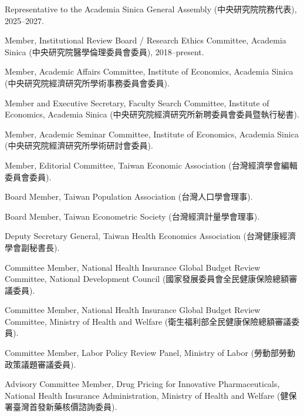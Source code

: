 \documentclass[10pt,letterpaper]{article}
\renewenvironment{itemize}{
  \begin{list}{}{
      \setlength{\leftmargin}{1.5em}
      \setlength{\itemsep}{0.25em}
      \setlength{\parskip}{0pt}
      \setlength{\parsep}{0.25em}
    }
}{
  \end{list}
}
\begin{document}
\begin{itemize}
  \item Representative to the Academia Sinica General Assembly (中央研究院院務代表), 2025--2027.

  \item Member, Institutional Review Board / Research Ethics Committee, Academia Sinica
  (中央研究院醫學倫理委員會委員), 2018--present.

  \item Member, Academic Affairs Committee,
  Institute of Economics, Academia Sinica
  (中央研究院經濟研究所學術事務委員會委員).

  \item Member and Executive Secretary, Faculty Search Committee,
  Institute of Economics, Academia Sinica
  (中央研究院經濟研究所新聘委員會委員暨執行秘書).

  \item Member, Academic Seminar Committee,
  Institute of Economics, Academia Sinica
  (中央研究院經濟研究所學術研討會委員).

  \item Member, Editorial Committee, Taiwan Economic Association
  (台灣經濟學會編輯委員會委員).

  \item Board Member, Taiwan Population Association
  (台灣人口學會理事).

  \item Board Member, Taiwan Econometric Society
  (台灣經濟計量學會理事).

  \item Deputy Secretary General, Taiwan Health Economics Association
  (台灣健康經濟學會副秘書長).

  \item Committee Member, National Health Insurance Global Budget Review Committee,
  National Development Council
  (國家發展委員會全民健康保險總額審議委員).

  \item Committee Member, National Health Insurance Global Budget Review Committee,
  Ministry of Health and Welfare
  (衛生福利部全民健康保險總額審議委員).

  \item Committee Member, Labor Policy Review Panel, Ministry of Labor
  (勞動部勞動政策議題審議委員).

  \item Advisory Committee Member, Drug Pricing for Innovative Pharmaceuticals,
  National Health Insurance Administration, Ministry of Health and Welfare
  (健保署臺灣首發新藥核價諮詢委員).
\end{itemize}
\end{document}
